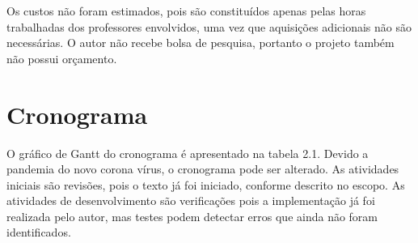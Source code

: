 Os custos não foram estimados, pois são constituídos apenas pelas horas trabalhadas dos professores envolvidos, uma vez que aquisições adicionais não são necessárias. O autor não recebe bolsa de pesquisa, portanto o projeto também não possui orçamento.

\section{Cronograma}

O gráfico de Gantt do cronograma é apresentado na tabela 2.1. Devido a pandemia do novo corona vírus, o cronograma pode ser alterado. As atividades iniciais são revisões, pois o texto já foi iniciado, conforme descrito no escopo. As atividades de desenvolvimento são verificações pois a implementação já foi realizada pelo autor, mas testes podem detectar erros que ainda não foram identificados.

